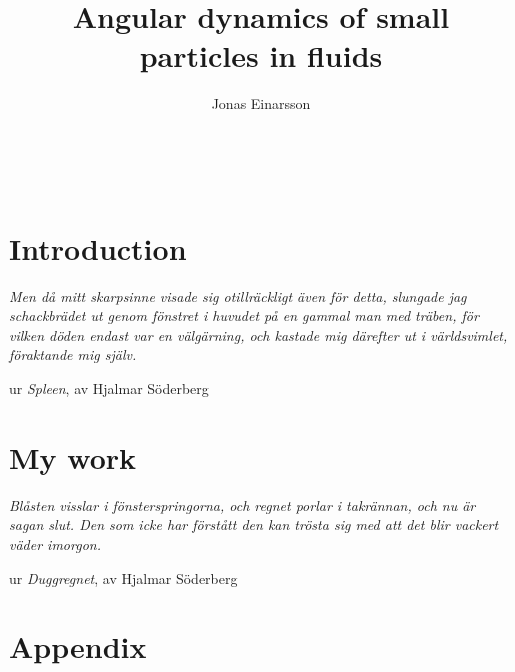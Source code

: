 \documentclass[licentiate,nocover,g5paper,11pt]{gu-thesis}
\title{Angular dynamics of small particles in fluids}
\author{Jonas Einarsson} %
\begin{document}
\pagestyle{empty}
\setcounter{page}{-100} %
~\newpage
\maketitlepage
\clearpage\makeprintinfopage
\cleardoublepage\makeabstractpage
\cleardoublepage\maketableofpaperspage



\cleardoublepage\tableofcontents

\cleardoublepage{}
\pagestyle{fancy}
\part{Introduction} %
\thispagestyle{empty}
 


\cleardoublepage\thispagestyle{fb}
{
\null\vfill
\centering
\parbox{8cm}{%
  \raggedright{\large\itshape%
Men då mitt skarpsinne visade sig otillräckligt även för detta, slungade jag schackbrädet ut genom fönstret i huvudet på en gammal man med träben, för vilken döden endast var en välgärning, och kastade mig därefter ut i världsvimlet, föraktande mig själv.\par\bigskip
  }   
  \raggedleft\large{ur \emph{Spleen}, av Hjalmar Söderberg}\par%
}
\vfill\vfill
}



\newpage\thispagestyle{fb}\cleardoublepage
\part{My work} %
\thispagestyle{fb}

\thispagestyle{fb}\cleardoublepage
\thispagestyle{fb}
{
\null\vfill
\centering
\parbox{8cm}{%
  \raggedright{\large\itshape%
Blåsten visslar i fönsterspringorna, och regnet porlar i takrännan, och nu är sagan slut. Den som icke har förstått den kan trösta sig med att det blir vackert väder imorgon.\par\bigskip
  }   
  \raggedleft\large{ur \emph{Duggregnet}, av Hjalmar Söderberg}\par%
}
\vfill\vfill
}
\newpage\thispagestyle{fb}\cleardoublepage
\thispagestyle{fb}\makeacknowledgementspage
\nocite{paperA,paperB,paperC,paperD,paperE,paperF,paperG}
\cleardoublepage
\nobibliography*

\cleardoublepage
\part*{Appendix} %
\appendix
%

\thispagestyle{fb}
\appendix
%
\end{document}
